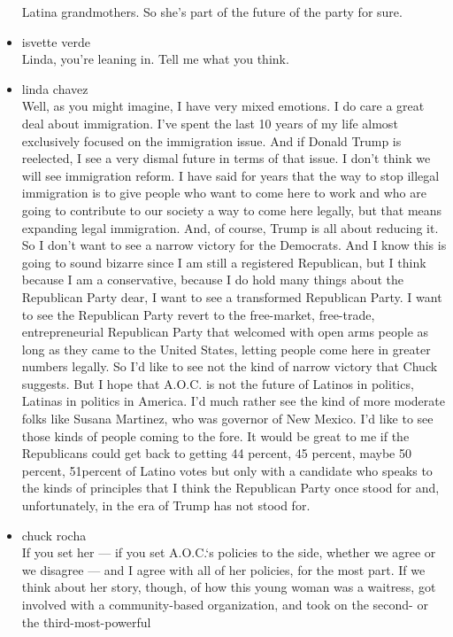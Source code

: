 \begin{itemize}
  Latina grandmothers. So she's part of the future of the party for
  sure.
\item
  isvette verde\\
  Linda, you're leaning in. Tell me what you think.
\item
  linda chavez\\
  Well, as you might imagine, I have very mixed emotions. I do care a
  great deal about immigration. I've spent the last 10 years of my life
  almost exclusively focused on the immigration issue. And if Donald
  Trump is reelected, I see a very dismal future in terms of that issue.
  I don't think we will see immigration reform. I have said for years
  that the way to stop illegal immigration is to give people who want to
  come here to work and who are going to contribute to our society a way
  to come here legally, but that means expanding legal immigration. And,
  of course, Trump is all about reducing it. So I don't want to see a
  narrow victory for the Democrats. And I know this is going to sound
  bizarre since I am still a registered Republican, but I think because
  I am a conservative, because I do hold many things about the
  Republican Party dear, I want to see a transformed Republican Party. I
  want to see the Republican Party revert to the free-market,
  free-trade, entrepreneurial Republican Party that welcomed with open
  arms people as long as they came to the United States, letting people
  come here in greater numbers legally. So I'd like to see not the kind
  of narrow victory that Chuck suggests. But I hope that A.O.C. is not
  the future of Latinos in politics, Latinas in politics in America. I'd
  much rather see the kind of more moderate folks like Susana Martinez,
  who was governor of New Mexico. I'd like to see those kinds of people
  coming to the fore. It would be great to me if the Republicans could
  get back to getting 44 percent, 45 percent, maybe 50 percent,
  51percent of Latino votes but only with a candidate who speaks to the
  kinds of principles that I think the Republican Party once stood for
  and, unfortunately, in the era of Trump has not stood for.
\item
  chuck rocha\\
  If you set her --- if you set A.O.C.`s policies to the side, whether
  we agree or we disagree --- and I agree with all of her policies, for
  the most part. If we think about her story, though, of how this young
  woman was a waitress, got involved with a community-based
  organization, and took on the second- or the third-most-powerful

\end{itemize}
